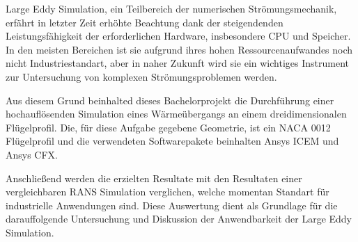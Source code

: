 Large Eddy Simulation, ein Teilbereich der numerischen Strömungsmechanik, erfährt in letzter Zeit erhöhte Beachtung dank der steigendenden Leistungsfähigkeit der erforderlichen Hardware, insbesondere CPU und Speicher. In den meisten Bereichen ist sie aufgrund ihres hohen Ressourcenaufwandes noch nicht Industriestandart, aber in naher Zukunft wird sie ein wichtiges Instrument zur Untersuchung von komplexen Str\"omungsproblemen werden.

Aus diesem Grund beinhalted dieses Bachelorprojekt die Durchf\"uhrung einer hochauflösenden Simulation eines W\"arme\"ubergangs an einem dreidimensionalen Fl\"ugelprofil. Die, für diese Aufgabe gegebene Geometrie, ist ein NACA 0012 Fl\"ugelprofil und die verwendeten Softwarepakete beinhalten Ansys ICEM und Ansys CFX. 

Anschließend werden die erzielten Resultate mit den Resultaten einer vergleichbaren RANS Simulation verglichen, welche momentan Standart für industrielle Anwendungen sind. Diese Auswertung dient als Grundlage für die darauffolgende Untersuchung und Diskussion der Anwendbarkeit der Large Eddy Simulation.